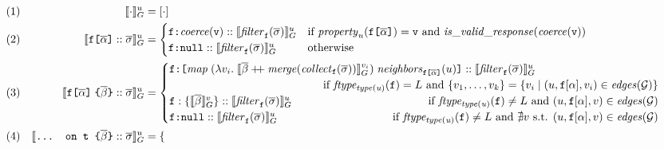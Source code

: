 
\begin{figure}[t]
\small
    \centering
    \begin{align*}
    & (1) & \eval{\cdot}{u} &= [\cdot] \\
    & (2) & \evalu{\fld :: \sset} &= \begin{cases}
        \resp{\mathit{coerce(\val)}} :: \evalfilteru{\sset}{\fkey}  
        & \text{if } \mathit{property}_{u}(\fld) = \val \text{ and } \mathit{is\_valid\_response}(\mathit{coerce}(\val)) \\
        \resp{\nval} :: \evalfilteru{\sset}{\fkey} 
        & \text{otherwise}
    \end{cases}\\
    & (3) & \evalu{\nfld{\overline{\beta}} :: \sset} &=
    \begin{cases}
        \resp{\texttt{[} \mathit{map}\; (\lambda v_{i}.\; \eval{\overline{\beta} \mdoubleplus \mathit{merge} (\mathit{collect}_{\fkey} (\sset))}{v_{i}})\; \mathit{neighbors}_{\fld}(u) \texttt{]}} :: \evalfilteru{\sset}{\fkey} \\  
         \hfill \text{ if } 
            \mathit{ftype_{type(u)}(\fkey)} = L \text{ and } \{v_{1}, \ldots, v_{k}\} = 
        \{v_{i} \mid (u, \fkey[\alpha], v_{i}) \in \mathit{edges}(\graph)\} \\
    \fkey:\{\eval{\subqueries{\beta}}{v}\} ::  \evalfilteru{\sset}{\fkey}  
         \hfill \text{ if } 
        \mathit{ftype_{type(u)}(\fkey)}  \neq L \text{ and } (u, \fkey[\alpha], v) \in \mathit{edges}(\graph) \\
    \resp{\nval} :: \evalfilteru{\sset}{\fkey} 
    \qquad \qquad \qquad \qquad \qquad
  \text{ if } \mathit{ftype_{type(u)}(\fkey)}  \neq L  \text{ and } \nexists v \text{ s.t. }  (u, \fkey[\alpha], v) \in \mathit{edges}(\graph) \\
    \end{cases}\\
    & (4) & \evalu{\ifrag{t}{\overline{\beta}} :: \sset} &= 
    \begin{cases}

\end{cases}
\end{align*}
\end{figure}
